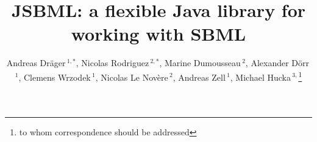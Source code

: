 \documentclass{bioinfo}
\begin{document}
\application
\title[JSBML: The Java library for SBML]{JSBML: a flexible Java library
for working with SBML} \author[Dr\"ager \textit{et~al.}]{Andreas
Dr\"ager\,$^{1,*}$,
Nicolas Rodriguez\,$^{2,*}$,
Marine Dumousseau\,$^{2}$,
Alexander D\"orr\,$^{1}$,
Clemens Wrzodek\,$^{1}$,
Nicolas Le Nov\`{e}re\,$^{2}$,
Andreas Zell\,$^{1}$,
Michael Hucka\,$^{3,}$\footnote{to whom correspondence should be addressed}}
\address{$^{1}$Center for Bioinformatics Tuebingen (ZBIT), University of
Tuebingen, T\"ubingen, Germany.\\
$^{2}$European Bioinformatics Institute, Wellcome Trust Genome Campus, Hinxton,
Cambridge, UK\\
$^{3}$Computing and Mathematical Sciences, California Institute of Technology,
Pasadena, CA, USA}



\maketitle
\end{document}
